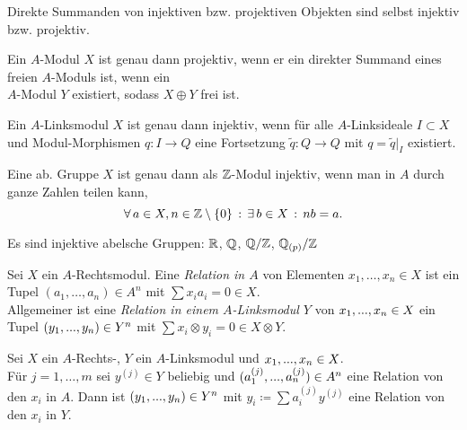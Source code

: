 \documentclass{cheat-sheet}
\begin{document}
\begin{lem}
  Direkte Summanden von injektiven bzw. projektiven Objekten sind selbst injektiv bzw. projektiv.
\end{lem}

\begin{lem}
  Ein $A$-Modul $X$ ist genau dann projektiv, wenn er ein direkter Summand eines freien $A$-Moduls ist, \dh{} wenn ein \\
  $A$-Modul $Y$ existiert, sodass $X \oplus Y$ frei ist.
\end{lem}

\begin{lem}
  Ein $A$-Linksmodul $X$ ist genau dann injektiv, wenn für alle $A$-Linksideale $I \subset X$ und Modul-Morphismen $q : I \to Q$ eine Fortsetzung $\tilde{q} : Q \to Q$ mit $q = \tilde{q}|_I$ existiert.
\end{lem}

\begin{lem}
  Eine ab. Gruppe $X$ ist genau dann als $\mathbb{Z}$-Modul injektiv, wenn man in $A$ durch ganze Zahlen teilen kann, \dh{}
  \[ \forall \, {a \in X, n \in \mathbb{Z} \setminus \{ 0 \}} \,:\, \exists \, {b \in X} \,:\, nb = a. \]
\end{lem}

\begin{bspe}
  Es sind injektive abelsche Gruppen: $\mathbb{R}$, $\mathbb{Q}$, $\mathbb{Q}/\mathbb{Z}$, $\mathbb{Q}_{(p)}/\mathbb{Z}$
\end{bspe}

\begin{defn}
  Sei $X$ ein $A$-Rechtsmodul. Eine \emph{Relation in $A$} von Elementen $x_1, \ldots, x_n \in X$ ist ein Tupel $(a_1, \ldots, a_n) \in A^n$ mit $\sum x_i a_i = 0 \in X$. \\
  Allgemeiner ist eine \emph{Relation in einem $A$-Linksmodul $Y$} von $x_1, ..., x_n \in X$ ein Tupel $(y_1, ..., y_n) \in Y^n$ mit $\sum x_i \otimes y_i \!=\! 0 \in X \!\otimes\! Y$.
\end{defn}

\begin{bem}
  Sei $X$ ein $A$-Rechts-, $Y$ ein $A$-Linksmodul und $x_1, ..., x_n \in X$. \\
  Für $j = 1, \ldots, m$ sei $y^{(j)} \in Y$ beliebig und $(a_1^{(j)}, ..., a_n^{(j)}) \in A^n$ eine Relation von den $x_i$ in $A$.
  Dann ist $(y_1, ..., y_n) \in Y^n$ mit $y_i \coloneqq \sum a_i^{(j)} y^{(j)}$ eine Relation von den $x_i$ in $Y$.
\end{bem}
\end{document}
